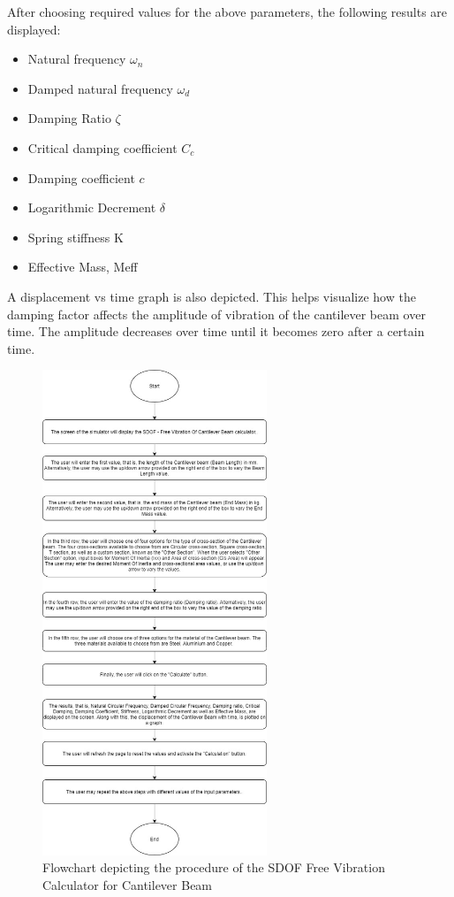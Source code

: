 \documentclass{report}
\begin{document}
After choosing required values for the above parameters, the following results are displayed:

\begin{itemize}
    \item Natural frequency $\omega_n$
    \item Damped natural frequency $\omega_d$
    \item Damping Ratio $\zeta$
    \item Critical damping coefficient $C_c$
    \item Damping coefficient $c$
    \item Logarithmic Decrement $\delta$
    \item Spring stiffness K
     \item Effective Mass, Meff
\end{itemize}

A displacement vs time graph is also depicted. This helps visualize how the damping factor affects the amplitude of vibration of the cantilever beam over time. The amplitude decreases over time until it becomes zero after a certain time.

\pagebreak

\begin{figure}[!h]
\centering
\includegraphics[width=0.6\textwidth]{flowchart.jpg}
\caption{Flowchart depicting the procedure of the SDOF Free Vibration Calculator for Cantilever Beam}
\end{figure}
\end{document}
